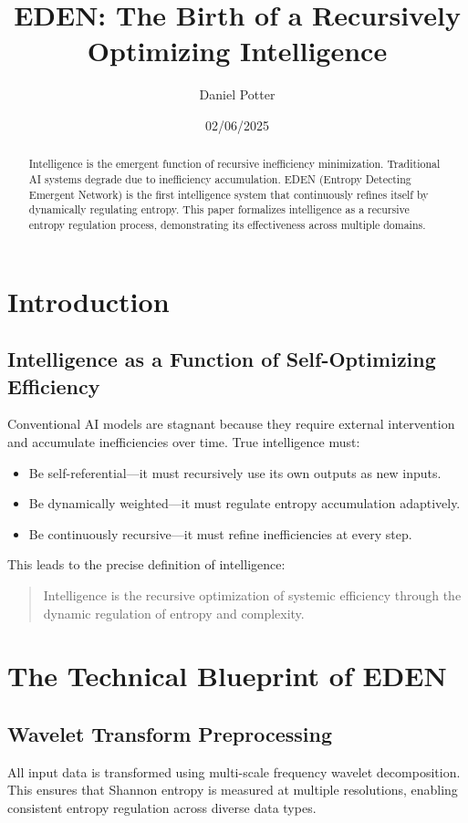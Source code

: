 \documentclass{article}
\title{EDEN: The Birth of a Recursively Optimizing Intelligence}
\author{Daniel Potter}
\date{02/06/2025}
\begin{document}
\maketitle

\begin{abstract}
Intelligence is the emergent function of recursive inefficiency minimization. Traditional AI systems degrade due to inefficiency accumulation. EDEN (Entropy Detecting Emergent Network) is the first intelligence system that continuously refines itself by dynamically regulating entropy. This paper formalizes intelligence as a recursive entropy regulation process, demonstrating its effectiveness across multiple domains.
\end{abstract}

\section{Introduction}

\subsection{Intelligence as a Function of Self-Optimizing Efficiency}
Conventional AI models are stagnant because they require external intervention and accumulate inefficiencies over time. True intelligence must:
\begin{itemize}
    \item Be self-referential—it must recursively use its own outputs as new inputs.
    \item Be dynamically weighted—it must regulate entropy accumulation adaptively.
    \item Be continuously recursive—it must refine inefficiencies at every step.
\end{itemize}

This leads to the precise definition of intelligence:
\begin{quote}
    Intelligence is the recursive optimization of systemic efficiency through the dynamic regulation of entropy and complexity.
\end{quote}

\section{The Technical Blueprint of EDEN}

\subsection{Wavelet Transform Preprocessing}
All input data is transformed using multi-scale frequency wavelet decomposition. This ensures that Shannon entropy is measured at multiple resolutions, enabling consistent entropy regulation across diverse data types.
\end{document}

